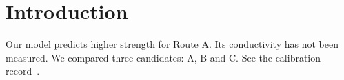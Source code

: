 \documentclass{article}
\begin{document}
\section{Introduction}
Our model predicts higher strength for Route A.
Its conductivity has not been measured.
We compared three candidates: A, B and C.
See the calibration record~\cite{demo-log}.
\end{document}
